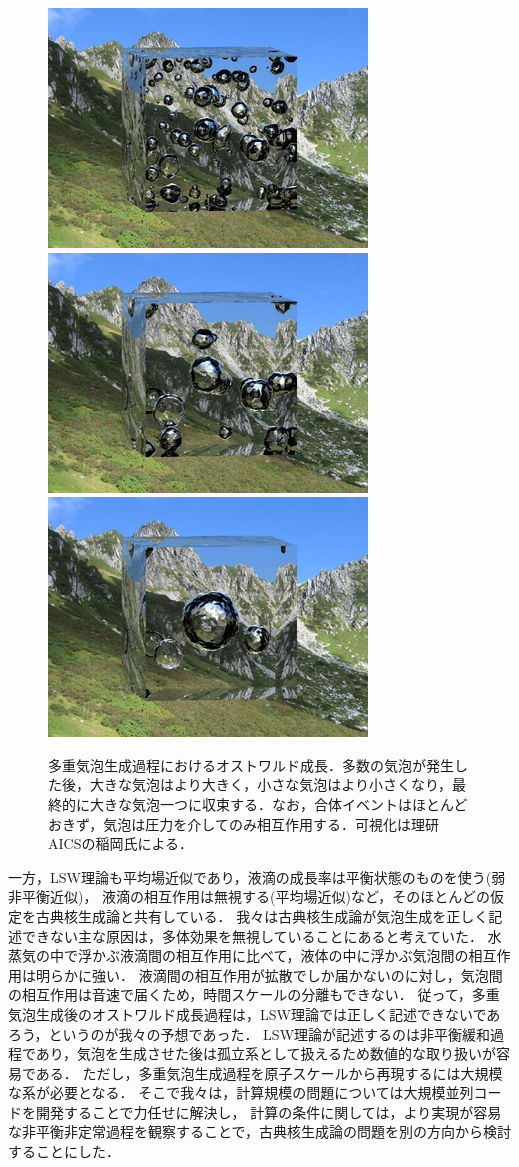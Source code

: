 \documentclass[topics,b5paper,papersize,twocolumn]{jsarticle}
\begin{document}
\begin{figure}[tb]
\includegraphics[width=0.3\linewidth]{bubble1.jpg}
\includegraphics[width=0.3\linewidth]{bubble2.jpg}
\includegraphics[width=0.3\linewidth]{bubble3.jpg}
\caption{
多重気泡生成過程におけるオストワルド成長．多数の気泡が発生した後，大きな気泡はより大きく，小さな気泡はより小さくなり，最終的に大きな気泡一つに収束する．なお，合体イベントはほとんどおきず，気泡は圧力を介してのみ相互作用する．可視化は理研AICSの稲岡氏による\cite{Watanabe2014}．
}
\label{fig_bubble}
\end{figure}

一方，LSW理論も平均場近似であり，液滴の成長率は平衡状態のものを使う(弱非平衡近似)，
液滴の相互作用は無視する(平均場近似)など，そのほとんどの仮定を古典核生成論と共有している．
我々は古典核生成論が気泡生成を正しく記述できない主な原因は，多体効果を無視していることにあると考えていた．
水蒸気の中で浮かぶ液滴間の相互作用に比べて，液体の中に浮かぶ気泡間の相互作用は明らかに強い．
液滴間の相互作用が拡散でしか届かないのに対し，気泡間の相互作用は音速で届くため，時間スケールの分離もできない．
従って，多重気泡生成後のオストワルド成長過程は，LSW理論では正しく記述できないであろう，というのが我々の予想であった．
LSW理論が記述するのは非平衡緩和過程であり，気泡を生成させた後は孤立系として扱えるため数値的な取り扱いが容易である．
ただし，多重気泡生成過程を原子スケールから再現するには大規模な系が必要となる．
そこで我々は，計算規模の問題については大規模並列コードを開発することで力任せに解決し，
計算の条件に関しては，より実現が容易な非平衡非定常過程を観察することで，古典核生成論の問題を別の方向から検討することにした．
\end{document}

